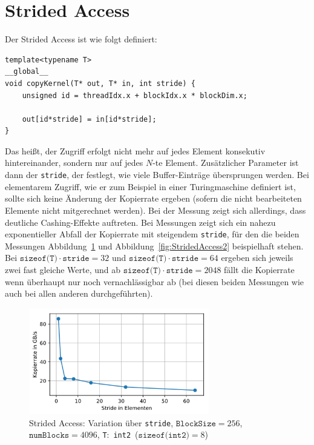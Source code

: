 \documentclass[11pt, abstract=on]{scrartcl}
\begin{document}
\section{Strided Access}
Der Strided Access ist wie folgt definiert:

\begin{lstlisting} 
template<typename T>
__global__
void copyKernel(T* out, T* in, int stride) {
	unsigned id = threadIdx.x + blockIdx.x * blockDim.x;
		
	out[id*stride] = in[id*stride];
}
\end{lstlisting}

Das heißt, der Zugriff erfolgt nicht mehr auf jedes Element konsekutiv hintereinander, sondern nur auf jedes $N$-te Element. Zusätzlicher Parameter ist dann der \texttt{stride}, der festlegt, wie viele Buffer-Einträge übersprungen werden. Bei elementarem Zugriff, wie er zum Beispiel in einer Turingmaschine definiert ist, sollte sich keine Änderung der Kopierrate ergeben (sofern die nicht bearbeiteten Elemente nicht mitgerechnet werden). Bei der Messung zeigt sich allerdings, dass deutliche Cashing-Effekte auftreten. Bei Messungen zeigt sich ein nahezu exponentieller Abfall der Kopierrate mit steigendem \texttt{stride}, für den die beiden Messungen Abbildung~\ref{fig:StridedAccess1} und Abbildung~\ref{fig:StridedAccess2} beispielhaft stehen. Bei $\texttt{sizeof(T)} \cdot \texttt{stride} = 32$ und $\texttt{sizeof(T)} \cdot \texttt{stride} = 64$ ergeben sich jeweils zwei fast gleiche Werte, und ab $\texttt{sizeof(T)} \cdot \texttt{stride} = 2048$ fällt die Kopierrate wenn überhaupt nur noch vernachlässigbar ab (bei diesen beiden Messungen wie auch bei allen anderen durchgeführten).

\begin{figure} [htbp]
 	\centering
 		\includegraphics[width=0.7\textwidth]{Graph_StridedAccess1.png}
 	\caption{Strided Access: Variation über \texttt{stride}, $\texttt{BlockSize} = 256$, $\texttt{numBlocks} = 4096$, \texttt{T}:~\texttt{int2}~($\texttt{sizeof(int2)} = 8$)}
 	\label{fig:StridedAccess1}
\end{figure}
\end{document}
